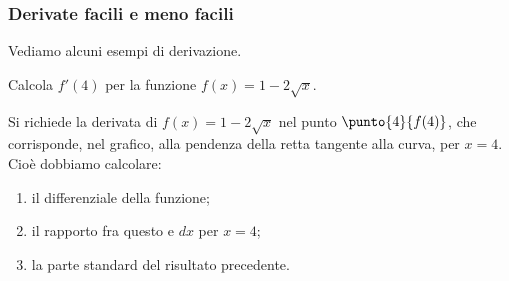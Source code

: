 \subsubsection{Derivate facili e meno facili}
Vediamo alcuni esempi di derivazione.

\begin{esempio}
  Calcola $f'(4)$ per la funzione $f(x)=1-2\sqrt{x}$.
\begin{inaccessibleblock}
 \begin{center}
 \begin{minipage}[]{.40 \textwidth}
    \vspace{-5mm} 
  \derivaradice
 \end{minipage} 
 \hfill
 \begin{minipage}[]{.58 \textwidth}
   \vspace{5mm}
  Si richiede la derivata di $f(x)=1-2\sqrt{x}$ nel punto 
  $\punto{4}{f(4)}$, che corrisponde, nel grafico, alla pendenza della 
  retta tangente alla curva, per $x=4$. Cioè dobbiamo calcolare:
  \begin{enumerate} [noitemsep]
   \item il differenziale della funzione;
   \item il rapporto fra questo e $dx$ per $x=4$;
   \item la parte standard del risultato precedente.
  \end{enumerate}
\end{minipage}
\end{center}
\end{inaccessibleblock}
\label{}


\end{esempio}
